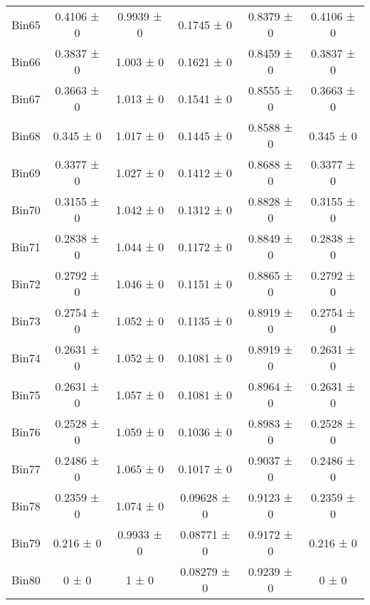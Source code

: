 \begin{tabular}{@{\extracolsep{4pt}}lccccc@{}}
     Bin65 & 0.4106 ± 0 & 0.9939 ± 0 & 0.1745 ± 0 & 0.8379 ± 0 & 0.4106 ± 0 \\ 
     Bin66 & 0.3837 ± 0 & 1.003 ± 0 & 0.1621 ± 0 & 0.8459 ± 0 & 0.3837 ± 0 \\ 
     Bin67 & 0.3663 ± 0 & 1.013 ± 0 & 0.1541 ± 0 & 0.8555 ± 0 & 0.3663 ± 0 \\ 
     Bin68 & 0.345 ± 0 & 1.017 ± 0 & 0.1445 ± 0 & 0.8588 ± 0 & 0.345 ± 0 \\ 
     Bin69 & 0.3377 ± 0 & 1.027 ± 0 & 0.1412 ± 0 & 0.8688 ± 0 & 0.3377 ± 0 \\ 
     Bin70 & 0.3155 ± 0 & 1.042 ± 0 & 0.1312 ± 0 & 0.8828 ± 0 & 0.3155 ± 0 \\ 
     Bin71 & 0.2838 ± 0 & 1.044 ± 0 & 0.1172 ± 0 & 0.8849 ± 0 & 0.2838 ± 0 \\ 
     Bin72 & 0.2792 ± 0 & 1.046 ± 0 & 0.1151 ± 0 & 0.8865 ± 0 & 0.2792 ± 0 \\ 
     Bin73 & 0.2754 ± 0 & 1.052 ± 0 & 0.1135 ± 0 & 0.8919 ± 0 & 0.2754 ± 0 \\ 
     Bin74 & 0.2631 ± 0 & 1.052 ± 0 & 0.1081 ± 0 & 0.8919 ± 0 & 0.2631 ± 0 \\ 
     Bin75 & 0.2631 ± 0 & 1.057 ± 0 & 0.1081 ± 0 & 0.8964 ± 0 & 0.2631 ± 0 \\ 
     Bin76 & 0.2528 ± 0 & 1.059 ± 0 & 0.1036 ± 0 & 0.8983 ± 0 & 0.2528 ± 0 \\ 
     Bin77 & 0.2486 ± 0 & 1.065 ± 0 & 0.1017 ± 0 & 0.9037 ± 0 & 0.2486 ± 0 \\ 
     Bin78 & 0.2359 ± 0 & 1.074 ± 0 & 0.09628 ± 0 & 0.9123 ± 0 & 0.2359 ± 0 \\ 
     Bin79 & 0.216 ± 0 & 0.9933 ± 0 & 0.08771 ± 0 & 0.9172 ± 0 & 0.216 ± 0 \\ 
     Bin80 & 0 ± 0 & 1 ± 0 & 0.08279 ± 0 & 0.9239 ± 0 & 0 ± 0 \\ 
\hline\hline
  \end{tabular}
